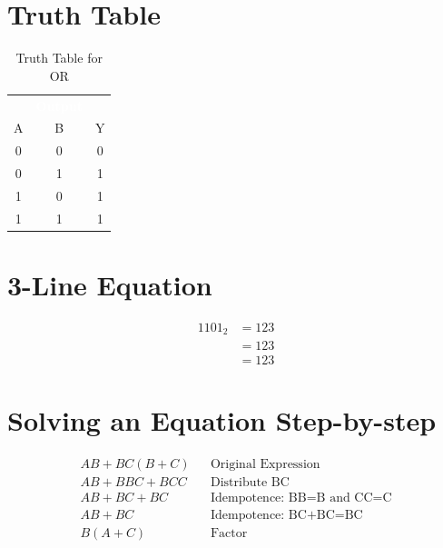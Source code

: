 \section{Truth Table}
\begin{table}[H]
	\sffamily
	\newcommand{\head}[1]{\textcolor{white}{\textbf{#1}}}		
	\begin{center}
		\begin{tabular}{ccc} 
			\rowcolor{black!75}
			\multicolumn{2}{c}{\head{Inputs}} & \head{Output} \\
			A & B & Y \\
			\hline
			0 & 0 & 0 \\
			0 & 1 & 1 \\
			1 & 0 & 1 \\
			1 & 1 & 1 
		\end{tabular}
	\end{center}
	\caption{Truth Table for OR}
	\label{tab:intro-01}
\end{table}


\section{3-Line Equation}
\begin{align}
	\label{03:eq:identity_example}
	1101_2 &= 123 \\
	\nonumber
	&= 123 \\
	\nonumber
	&= 123
\end{align}


\section{Solving an Equation Step-by-step}
\begin{align}
	\label{04:soln:solving_equation_one}
	AB+BC(B+C) && \text{Original Expression} \\
	\nonumber
	AB+BBC+BCC && \text{Distribute BC} \\
	\nonumber
	AB+BC+BC && \text{Idempotence: BB=B and CC=C} \\
	\nonumber
	AB+BC && \text{Idempotence: BC+BC=BC} \\
	\nonumber
	B(A+C) && \text{Factor} \\
\end{align}


